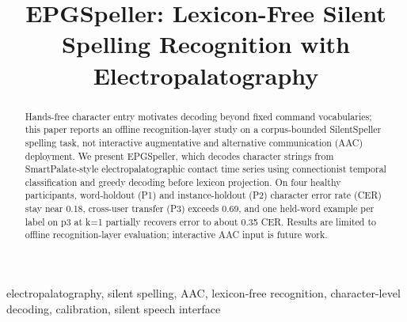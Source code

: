 \documentclass[conference]{IEEEtran}
\begin{document}
\title{EPGSpeller: Lexicon-Free Silent Spelling Recognition with Electropalatography}

\author{}

\maketitle

\begin{abstract}
Hands-free character entry motivates decoding beyond fixed command vocabularies; this paper reports an offline recognition-layer study on a corpus-bounded SilentSpeller spelling task, not interactive augmentative and alternative communication (AAC) deployment.
We present EPGSpeller, which decodes character strings from SmartPalate-style electropalatographic contact time series using connectionist temporal classification and greedy decoding before lexicon projection.
On four healthy participants, word-holdout (P1) and instance-holdout (P2) character error rate (CER) stay near 0.18, cross-user transfer (P3) exceeds 0.69, and one held-word example per label on p3 at k=1 partially recovers error to about 0.35 CER.
Results are limited to offline recognition-layer evaluation; interactive AAC input is future work.
\end{abstract}

\begin{IEEEkeywords}
electropalatography, silent spelling, AAC, lexicon-free recognition, character-level decoding, calibration, silent speech interface
\end{IEEEkeywords}









\clearpage


\end{document}
